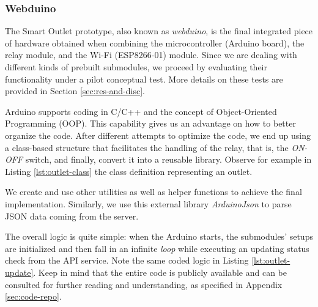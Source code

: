 \subsubsection{Webduino}
The Smart Outlet prototype, also known as \emph{webduino}, is the final
integrated piece of hardware obtained when combining the microcontroller
(Arduino board), the relay module, and the Wi-Fi (ESP8266-01) module. Since we
are dealing with different kinds of prebuilt submodules, we proceed by evaluating their functionality under a pilot conceptual test. More details on these tests are provided in Section \ref{sec:res-and-disc}.

Arduino supports coding in C/C++ and the concept of Object-Oriented Programming
(OOP). This capability gives us an advantage on how to better organize the code.
After different attempts to optimize the code, we end up using a class-based
structure that facilitates the handling of the relay, that is, the
\textit{ON-OFF} switch, and finally, convert it into a reusable library. Observe
for example in Listing \ref{lst:outlet-class} the class definition representing
an outlet.


We create and use other utilities as well as helper functions to achieve the final implementation. Similarly, we use this external library  \textit{ArduinoJson} to parse JSON data coming from the server.

The overall logic is quite simple: when the Arduino starts, the submodules' setups are initialized and then fall in an infinite \emph{loop} while executing
an updating status check from the API service. Note the same coded logic in
Listing \ref{lst:outlet-update}. Keep in mind that the entire code is publicly
available and can be consulted for further reading and understanding, as
specified in Appendix \ref{sec:code-repo}.


